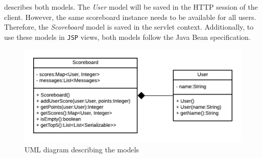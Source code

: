  describes both models. The \textit{User} model will be saved in the HTTP session of the client. However, the same scoreboard instance needs to be available for all users. Therefore, the \textit{Scoreboard} model is saved in the servlet context.
Additionally, to use these models in \texttt{JSP} views, both models follow the Java Bean specification.
\begin{figure}[h]
\centering
\includegraphics[scale=0.8]{images/03_impl/models}
\caption{UML diagram describing the models}
\label{fig:subsubsec:03_impl_backend_models_uml}
\end{figure}

\newpage
